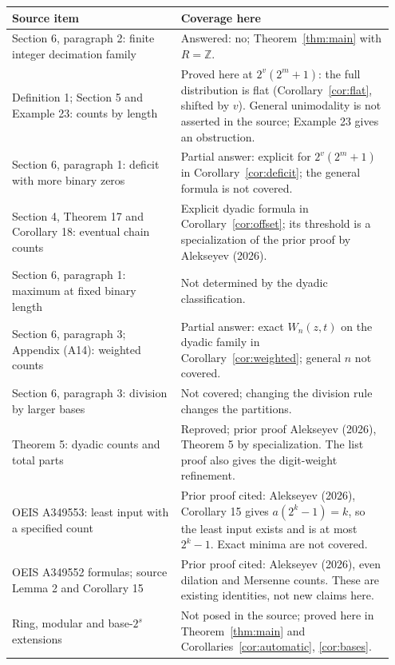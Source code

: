 \documentclass[11pt]{article}
\newcommand{\Z}{\mathbb Z}
\begin{document}
\smallskip
\noindent\begin{tabular}{@{}p{0.42\linewidth}p{0.53\linewidth}@{}}
\toprule
Source item & Coverage here\\
\midrule
Section 6, paragraph 2: finite integer decimation family & Answered: no;
Theorem~\ref{thm:main} with $R=\Z$.\\
Definition 1; Section 5 and Example 23: counts by length & Proved here
at $2^v(2^m+1)$: the full distribution is flat
(Corollary~\ref{cor:flat}, shifted by $v$). General unimodality is
not asserted in the source; Example 23 gives an obstruction.\\
Section 6, paragraph 1: deficit with more binary zeros &
Partial answer: explicit for $2^v(2^m+1)$ in
Corollary~\ref{cor:deficit}; the general formula is not covered.\\
Section 4, Theorem 17 and Corollary 18: eventual chain counts &
Explicit dyadic formula in Corollary~\ref{cor:offset}; its threshold
is a specialization of the prior proof by Alekseyev (2026).\\
Section 6, paragraph 1: maximum at fixed binary length &
Not determined by the dyadic classification.\\
Section 6, paragraph 3; Appendix (A14): weighted counts &
Partial answer: exact $W_n(z,t)$ on the dyadic family in
Corollary~\ref{cor:weighted}; general $n$ not covered.\\
Section 6, paragraph 3: division by larger bases &
Not covered; changing the division rule changes the partitions.\\
Theorem 5: dyadic counts and total parts & Reproved; prior proof
Alekseyev (2026), Theorem 5 by specialization. The list proof also gives
the digit-weight refinement.\\
OEIS A349553: least input with a specified count & Prior proof cited:
Alekseyev (2026), Corollary 15 gives $a(2^k-1)=k$, so the least input
exists and is at most $2^k-1$. Exact minima are not covered.\\
OEIS A349552 formulas; source Lemma 2 and Corollary 15 &
Prior proof cited: Alekseyev (2026), even dilation and Mersenne counts. These are
existing identities, not new claims here.\\
Ring, modular and base-$2^s$ extensions & Not posed in the source;
proved here in Theorem~\ref{thm:main} and
Corollaries~\ref{cor:automatic}, \ref{cor:bases}.\\
\bottomrule
\end{tabular}
\end{document}
